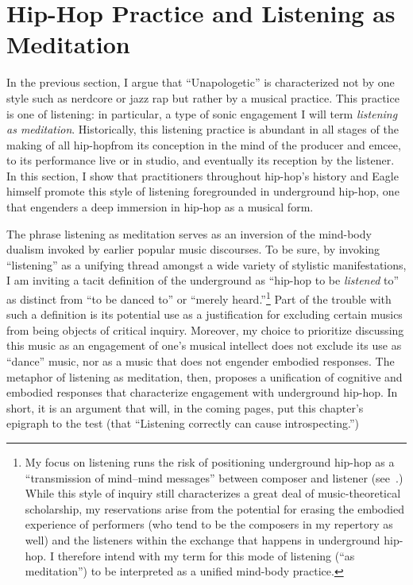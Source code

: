 \section{Hip-Hop Practice and Listening as Meditation} \label{listeningasmeditation}

In the previous section, I argue that ``Unapologetic'' is characterized not by one style such as
nerdcore or jazz rap but rather by a musical practice. This practice is one of listening: in 
particular, a type of sonic engagement I will term \emph{listening as meditation}. Historically,
this listening practice is abundant in all stages of the making of all hip-hop\textemdash from its 
conception in the mind of the producer and emcee, to its performance live or in studio, and 
eventually its reception by the listener. In this section, I show that practitioners throughout
hip-hop's history and Eagle himself promote this style of listening foregrounded in underground
hip-hop, one that engenders a deep immersion in hip-hop as a  musical form.

The phrase listening as meditation serves as an inversion of the mind-body dualism invoked by 
earlier popular music discourses. To be sure, by invoking ``listening'' as a unifying thread 
amongst a wide variety of stylistic manifestations, I am inviting a tacit definition of the 
underground as ``hip-hop to be \emph{listened} to'' as distinct from ``to be danced to'' or 
``merely heard.''\footnote{
    My focus on listening runs the risk of positioning underground hip-hop as a ``transmission of mind--mind messages'' 
    between composer and listener (see~\autocite[20]{suzanneg.cusickFeministTheoryMusic1994}.) While this style of
    inquiry still characterizes a great deal of music-theoretical scholarship, my reservations arise from the potential
    for erasing the embodied experience of performers (who tend to be the composers in my repertory as well) and the
    listeners within the exchange that happens in underground hip-hop. I therefore intend with my term for this mode
    of listening (``as meditation'') to be interpreted as a unified mind-body practice.}
Part of the trouble with such a definition is its potential use as a justification  for excluding 
certain musics from being objects of critical inquiry. Moreover, my choice to prioritize discussing 
this music as an engagement of one's musical intellect does not exclude its use as ``dance'' 
music, nor as a music that does not engender embodied responses. The metaphor of listening 
as meditation, then, proposes a unification of cognitive and embodied responses that characterize
engagement with underground hip-hop. In short, it is an argument that will, in the coming pages,
put this chapter's epigraph to the test (that ``Listening correctly can cause introspecting.'')

